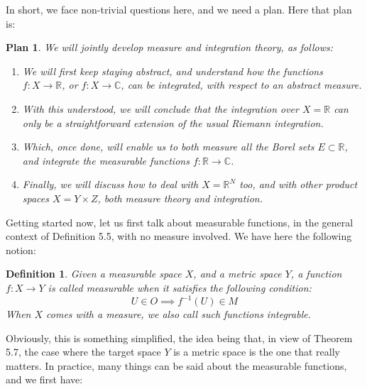 \documentclass[12pt]{amsbook}
\newtheorem{definition}[theorem]{Definition}
\newtheorem{plan}[theorem]{Plan}
\begin{document}
\medskip

In short, we face non-trivial questions here, and we need a plan. Here that plan is:

\begin{plan}
We will jointly develop measure and integration theory, as follows:
\begin{enumerate}
\item We will first keep staying abstract, and understand how the functions $f:X\to\mathbb R$, or $f:X\to\mathbb C$, can be integrated, with respect to an abstract measure.

\item With this understood, we will conclude that the integration over $X=\mathbb R$ can only be a straightforward extension of the usual Riemann integration.

\item Which, once done, will enable us to both measure all the Borel sets $E\subset\mathbb R$, and integrate the measurable functions $f:\mathbb R\to\mathbb C$.

\item Finally, we will discuss how to deal with $X=\mathbb R^N$ too, and with other product spaces $X=Y\times Z$, both measure theory and integration.
\end{enumerate}
\end{plan}

Getting started now, let us first talk about measurable functions, in the general context of Definition 5.5, with no measure involved. We have here the following notion:

\begin{definition}
Given a measurable space $X$, and a metric space $Y$, a function $f:X\to Y$ is called measurable when it satisfies the following condition:
$$U\in O\implies f^{-1}(U)\in M$$
When $X$ comes with a measure, we also call such functions integrable.
\end{definition}

Obviously, this is something simplified, the idea being that, in view of Theorem 5.7, the case where the target space $Y$ is a metric space is the one that really matters. In practice, many things can be said about the measurable functions, and we first have:
\end{document}
